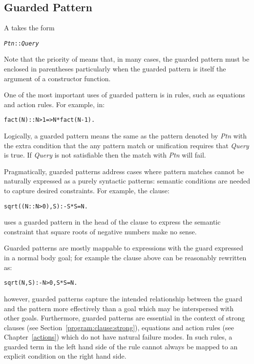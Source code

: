 \subsection{Guarded Pattern}
\label{expression:guard}

A  takes the form
\begin{alltt}
\emph{Ptn}::\emph{Query}
\end{alltt}
\begin{aside}
Note that the priority of \q{::} means that, in many cases, the guarded pattern must be enclosed in parentheses particularly when the guarded pattern is itself the argument of a constructor function. 
\end{aside}
One of the most important uses of guarded pattern is in rules, such as equations and action rules. For example, in:
\begin{alltt}
fact(N) :: N>1 => N*fact(N-1).
\end{alltt}
Logically, a guarded pattern means the same as the pattern denoted by \emph{Ptn} with the extra condition that the any pattern match or unification requires that \emph{Query} is true. If \emph{Query} is not satisfiable then the match with \emph{Ptn} will fail.

Pragmatically, guarded patterns address cases where pattern matches cannot be naturally expressed as a purely syntactic patterns: semantic conditions are needed to capture desired constraints. For example, the clause:
\begin{alltt}
sqrt((N::N>0),S) :- S*S=N.
\end{alltt}
uses a guarded pattern in the head of the clause to express the semantic constraint that square roots of negative numbers make no sense.

Guarded patterns are mostly mappable to expressions with the guard expressed in a normal body goal; for example the  clause above can be reasonably rewritten as:
\begin{alltt}
sqrt(N,S) :- N>0, S*S=N.
\end{alltt}
however, guarded patterns capture the intended relationship between the guard and the pattern more effectively than a goal which may be interspersed with other goals. Furthermore, guarded patterns are essential in the context of strong clauses (see Section~\vref{program:clause:strong}), equations and action rules (see Chapter~\vref{actions}) which do not have natural failure modes. In such rules, a guarded term in the left hand side of the rule cannot always be mapped to an explicit condition on the right hand side.

